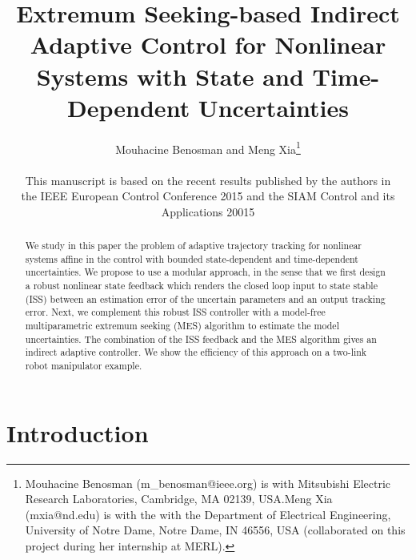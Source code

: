 \documentclass[twoside,leqno,onecolumn]{article}
\begin{document}
\title{Extremum Seeking-based Indirect Adaptive Control for Nonlinear Systems with State and Time-Dependent Uncertainties}
\author{Mouhacine Benosman and Meng Xia\thanks{Mouhacine Benosman
(m{\_}benosman@ieee.org) is with Mitsubishi Electric Research
Laboratories, Cambridge, MA 02139, USA.Meng Xia (mxia@nd.edu) is
with the with the Department of Electrical Engineering, University
of Notre Dame, Notre Dame, IN 46556, USA (collaborated on this
project during her internship at MERL). }\\\\This manuscript is
based on the recent results published by the authors in\\ the IEEE
European Control Conference 2015 and the SIAM Control and its
Applications 20015}

\date{}
\maketitle


\begin{abstract}
We study in this paper the problem of adaptive trajectory tracking
for nonlinear systems affine in the control with bounded
state-dependent and time-dependent uncertainties. We propose to
use a modular approach, in the sense that we first design a robust
nonlinear state feedback which renders the closed loop input to
state stable (ISS) between an estimation error of the uncertain
parameters and an output tracking error. Next, we complement this
robust ISS controller with a model-free multiparametric extremum
seeking (MES) algorithm to estimate the model uncertainties. The
combination of the ISS feedback and the MES algorithm gives an
indirect adaptive controller. We show the efficiency of this
approach on a two-link robot manipulator example.
\end{abstract}



\section{Introduction}
\end{document}
